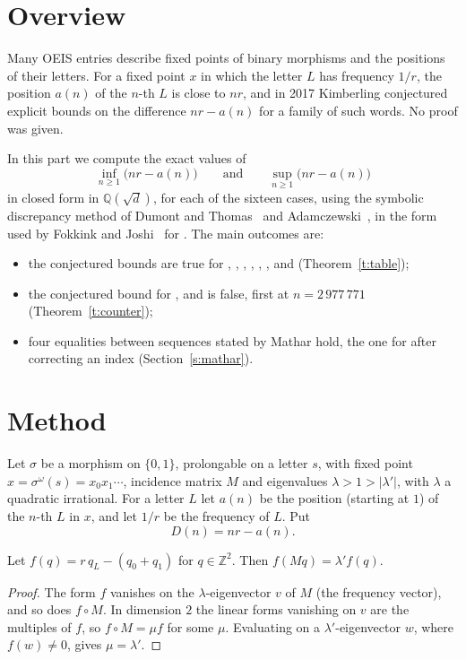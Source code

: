 \section{Overview}\label{s:p1intro}
Many OEIS entries describe fixed points of binary morphisms and the positions of their letters. For a
fixed point $x$ in which the letter $L$ has frequency $1/r$, the position $a(n)$ of the $n$-th $L$ is close
to $nr$, and in 2017 Kimberling conjectured explicit bounds on the difference $nr-a(n)$ for a family of such
words. No proof was given.

In this part we compute the exact values of
\[ \inf_{n\ge1}\bigl(nr-a(n)\bigr)\qquad\text{and}\qquad \sup_{n\ge1}\bigl(nr-a(n)\bigr) \]
in closed form in $\mathbb{Q}(\sqrt d)$, for each of the sixteen cases, using the symbolic discrepancy method
of Dumont and Thomas~\cite{DT} and Adamczewski~\cite{Ad}, in the form used by Fokkink and Joshi~\cite{FJ}
for . The main outcomes are:
\begin{itemize}
\item the conjectured bounds are true for , , , ,
  , ,  and  (Theorem~\ref{t:table});
\item the conjectured bound for ,  and  is false, first at
  $n = 2\,977\,771$ (Theorem~\ref{t:counter});
\item four equalities between sequences stated by Mathar hold, the one for  after
  correcting an index (Section~\ref{s:mathar}).
\end{itemize}

\section{Method}\label{s:method}
Let $\sigma$ be a morphism on $\{0,1\}$, prolongable on a letter $s$, with fixed point
$x=\sigma^\omega(s)=x_0x_1\cdots$, incidence matrix $M$ and eigenvalues $\lambda>1>|\lambda'|$, with
$\lambda$ a quadratic irrational. For a letter $L$ let $a(n)$ be the position (starting at $1$) of the
$n$-th $L$ in $x$, and let $1/r$ be the frequency of $L$. Put
\[ D(n)=nr-a(n). \]

\begin{lemma}\label{l:eigen} Let $f(q)=r\,q_L-(q_0+q_1)$ for $q\in\mathbb{Z}^2$. Then $f(Mq)=\lambda' f(q)$.\end{lemma}
\begin{proof} The form $f$ vanishes on the $\lambda$-eigenvector $v$ of $M$ (the frequency vector), and so
does $f\circ M$. In dimension $2$ the linear forms vanishing on $v$ are the multiples of $f$, so
$f\circ M=\mu f$ for some $\mu$. Evaluating on a $\lambda'$-eigenvector $w$, where $f(w)\ne0$, gives
$\mu=\lambda'$. \end{proof}

